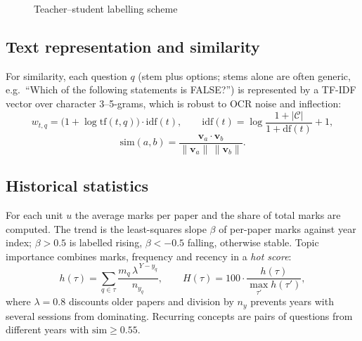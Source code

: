 \begin{figure}[h]
\centering
{}
\caption{Teacher--student labelling scheme}
\label{fig:distill}
\end{figure}

\subsection{Text representation and similarity}
For similarity, each question $q$ (stem plus options; stems alone are often generic, e.g.\ ``Which of the following
statements is FALSE?'') is represented by a TF-IDF vector over character 3--5-grams, which is robust to OCR noise and
inflection:
\begin{equation}
  w_{t,q} = \bigl(1+\log \mathrm{tf}(t,q)\bigr)\cdot \mathrm{idf}(t), \qquad
  \mathrm{idf}(t)=\log\frac{1+|\mathcal{C}|}{1+\mathrm{df}(t)}+1 ,
  \label{eq:tfidf}
\end{equation}
\begin{equation}
  \mathrm{sim}(a,b)=\frac{\mathbf{v}_a\cdot\mathbf{v}_b}{\lVert\mathbf{v}_a\rVert\,\lVert\mathbf{v}_b\rVert}.
  \label{eq:cos}
\end{equation}

\subsection{Historical statistics}
For each unit $u$ the average marks per paper and the share of total marks are computed. The trend is the least-squares
slope $\beta$ of per-paper marks against year index; $\beta>0.5$ is labelled rising, $\beta<-0.5$ falling, otherwise
stable. Topic importance combines marks, frequency and recency in a \emph{hot score}:
\begin{equation}
  h(\tau)=\sum_{q\in\tau}\frac{m_q\,\lambda^{\,Y-y_q}}{n_{y_q}}, \qquad
  H(\tau)=100\cdot\frac{h(\tau)}{\max_{\tau'}h(\tau')},
  \label{eq:hot}
\end{equation}
where $\lambda=0.8$ discounts older papers and division by $n_{y}$ prevents years with several sessions from dominating.
Recurring concepts are pairs of questions from different years with $\mathrm{sim}\ge 0.55$.

